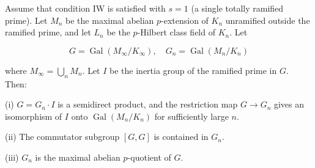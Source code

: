 Assume that condition IW is satisfied with $s = 1$ (a single totally ramified prime). Let $M_n$ be the maximal abelian $p$-extension of $K_n$ unramified outside the ramified prime, and let $L_n$ be the $p$-Hilbert class field of $K_n$. Let

$$
G = \operatorname{Gal}(M_\infty / K_\infty), \quad G_n = \operatorname{Gal}(M_n / K_n)
$$

where $M_\infty = \bigcup_n M_n$. Let $I$ be the inertia group of the ramified prime in $G$. Then:

(i) $G = G_n \cdot I$ is a semidirect product, and the restriction map $G \to G_n$ gives an isomorphism of $I$ onto $\operatorname{Gal}(M_n/K_n)$ for sufficiently large $n$.

(ii) The commutator subgroup $[G, G]$ is contained in $G_n$.

(iii) $G_n$ is the maximal abelian $p$-quotient of $G$.
